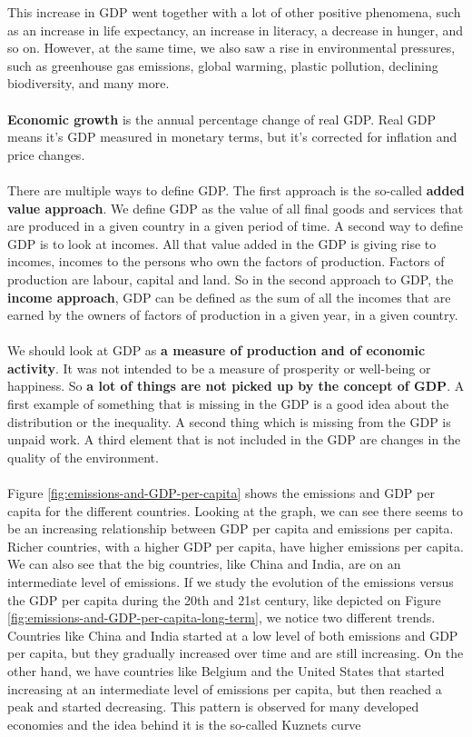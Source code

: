 \documentclass[../summary.tex]{subfiles}
\begin{document}
	\newpage
	This increase in GDP went together with a lot of other positive phenomena, such as an increase in life expectancy, an increase in literacy, a decrease in hunger, and so on. However, at the same time, we also saw a rise in environmental pressures, such as greenhouse gas emissions, global warming, plastic pollution, declining biodiversity, and many more. 
	\\\\
	\textbf{Economic growth} is the annual percentage change of real GDP. Real GDP means it's GDP measured in monetary terms, but it's corrected for inflation and price changes.
	\\\\
	There are multiple ways to define GDP. The first approach is the so-called \textbf{added value approach}. We define GDP as the value of all final goods and services that are produced in a given country in a given period of time. A second way to define GDP is to look at incomes. All that value added in the GDP is giving rise to incomes, incomes to the persons who own the factors of production. Factors of production are labour, capital and land. So in the second approach to GDP, the \textbf{income approach}, GDP can be defined as the sum of all the incomes that are earned by the owners of factors of production in a given year, in a given country. 
	\\\\
	We should look at GDP as \textbf{a measure of production and of economic activity}. It was not intended to be a measure of prosperity or well-being or happiness. So \textbf{a lot of things are not picked up by the concept of GDP}. A first example of something that is missing in the GDP is a good idea about the distribution or the inequality. A second thing which is missing from the GDP is unpaid work. A third element that is not included in the GDP are changes in the quality of the environment.
	\\\\	
	Figure \ref{fig:emissions-and-GDP-per-capita} shows the emissions and GDP per capita for the different countries. Looking at the graph, we can see there seems to be an increasing relationship between GDP per capita and emissions per capita. Richer countries, with a higher GDP per capita, have higher emissions per capita. We can also see that the big countries, like China and India, are on an intermediate level of emissions. If we study the evolution of the emissions versus the GDP per capita during the 20th and 21st century, like depicted on Figure \ref{fig:emissions-and-GDP-per-capita-long-term}, we notice two different trends. Countries like China and India started at a low level of both emissions and GDP per capita, but they gradually increased over time and are still increasing. On the other hand, we have countries like Belgium and the United States that started increasing at an intermediate level of emissions per capita, but then reached a peak and started decreasing. This pattern is observed for many developed economies and the idea behind it is the so-called Kuznets curve
	
\end{document}
